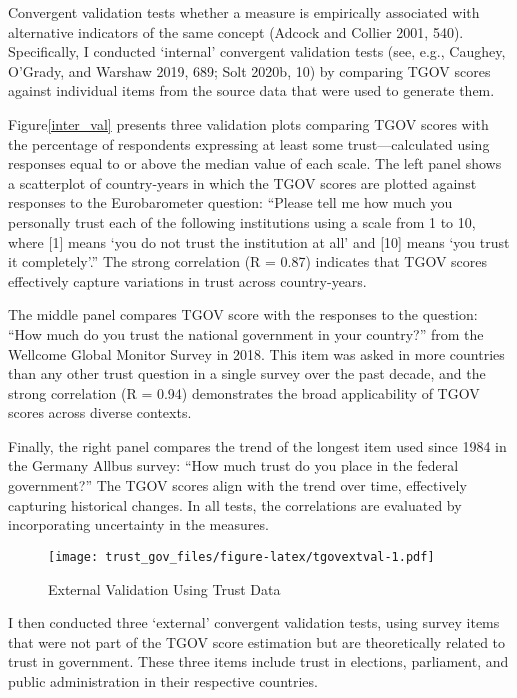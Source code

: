 \documentclass[
  12pt,
]{article}
\begin{document}
Convergent validation tests whether a measure is empirically associated with alternative indicators of the same concept (Adcock and Collier 2001, 540).
Specifically, I conducted `internal' convergent validation tests (see, e.g., Caughey, O'Grady, and Warshaw 2019, 689; Solt 2020b, 10) by comparing TGOV scores against individual items from the source data that were used to generate them.

Figure\nobreakspace{}\ref{inter_val} presents three validation plots comparing TGOV scores with the percentage of respondents expressing at least some trust---calculated using responses equal to or above the median value of each scale.
The left panel shows a scatterplot of country-years in which the TGOV scores are plotted against responses to the Eurobarometer question: ``Please tell me how much you personally trust each of the following institutions using a scale from 1 to 10, where {[}1{]} means `you do not trust the institution at all' and {[}10{]} means `you trust it completely'.''
The strong correlation (R = 0.87) indicates that TGOV scores effectively capture variations in trust across country-years.

The middle panel compares TGOV score with the responses to the question: ``How much do you trust the national government in your country?'' from the Wellcome Global Monitor Survey in 2018.
This item was asked in more countries than any other trust question in a single survey over the past decade, and the strong correlation (R = 0.94) demonstrates the broad applicability of TGOV scores across diverse contexts.

Finally, the right panel compares the trend of the longest item used since 1984 in the Germany Allbus survey: ``How much trust do you place in the federal government?''
The TGOV scores align with the trend over time, effectively capturing historical changes.
In all tests, the correlations are evaluated by incorporating uncertainty in the measures.

\begin{figure}
\centering
\texttt{[image: trust\_gov\_files/figure-latex/tgovextval-1.pdf]}
\caption{\label{fig:tgovextval}External Validation Using Trust Data \label{tgov_ev1}}
\end{figure}

I then conducted three `external' convergent validation tests, using survey items that were not part of the TGOV score estimation but are theoretically related to trust in government.
These three items include trust in elections, parliament, and public administration in their respective countries.
\end{document}
